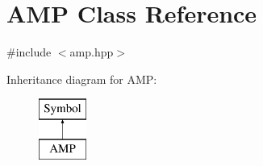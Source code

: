 \hypertarget{class_a_m_p}{\section{A\+M\+P Class Reference}
\label{class_a_m_p}
}


{\ttfamily \#include $<$amp.\+hpp$>$}

Inheritance diagram for A\+M\+P\+:\begin{figure}[H]
\begin{center}
\leavevmode
\includegraphics[height=2.000000cm]{class_a_m_p}
\end{center}
\end{figure}
